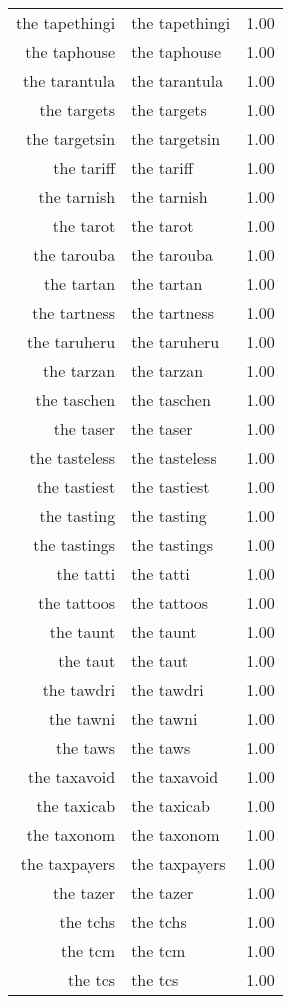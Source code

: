 \begin{table}[ht]
\begin{tabular}{rlr}
  the tapethingi & the tapethingi & 1.00 \\ 
  the taphouse & the taphouse & 1.00 \\ 
  the tarantula & the tarantula & 1.00 \\ 
  the targets & the targets & 1.00 \\ 
  the targetsin & the targetsin & 1.00 \\ 
  the tariff & the tariff & 1.00 \\ 
  the tarnish & the tarnish & 1.00 \\ 
  the tarot & the tarot & 1.00 \\ 
  the tarouba & the tarouba & 1.00 \\ 
  the tartan & the tartan & 1.00 \\ 
  the tartness & the tartness & 1.00 \\ 
  the taruheru & the taruheru & 1.00 \\ 
  the tarzan & the tarzan & 1.00 \\ 
  the taschen & the taschen & 1.00 \\ 
  the taser & the taser & 1.00 \\ 
  the tasteless & the tasteless & 1.00 \\ 
  the tastiest & the tastiest & 1.00 \\ 
  the tasting & the tasting & 1.00 \\ 
  the tastings & the tastings & 1.00 \\ 
  the tatti & the tatti & 1.00 \\ 
  the tattoos & the tattoos & 1.00 \\ 
  the taunt & the taunt & 1.00 \\ 
  the taut & the taut & 1.00 \\ 
  the tawdri & the tawdri & 1.00 \\ 
  the tawni & the tawni & 1.00 \\ 
  the taws & the taws & 1.00 \\ 
  the taxavoid & the taxavoid & 1.00 \\ 
  the taxicab & the taxicab & 1.00 \\ 
  the taxonom & the taxonom & 1.00 \\ 
  the taxpayers & the taxpayers & 1.00 \\ 
  the tazer & the tazer & 1.00 \\ 
  the tchs & the tchs & 1.00 \\ 
  the tcm & the tcm & 1.00 \\ 
  the tcs & the tcs & 1.00 \\ 

\end{tabular}
\end{table}
